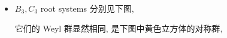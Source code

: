 \begin{itemize}
	\item $B_3, C_3$ root systems 分别见下图,
	
	\begin{figure}[H]
		\centering
	\end{figure}
	
	它们的 Weyl 群显然相同, 是下图中黄色立方体的对称群,
	

\end{itemize}
